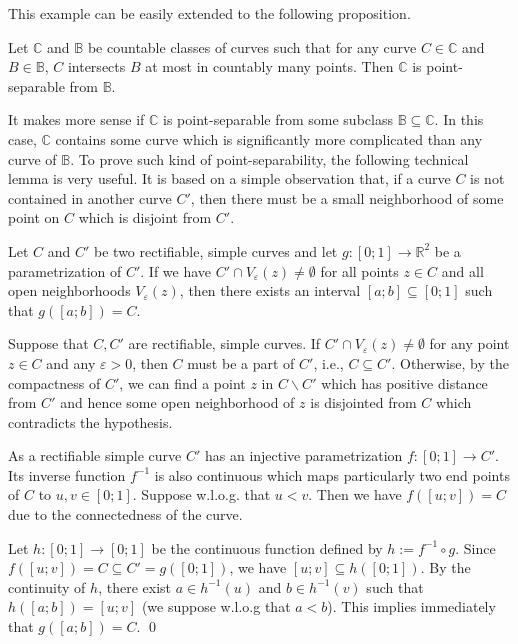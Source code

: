 \documentclass{LMCS}
\theoremstyle{plain}
\def\IB{\mathbb{B}}
\def\IC{\mathbb{C}}
\def\IR{\mathbb{R}}
\begin{document}
This example can be easily extended to the following proposition.

\begin{prop}\label{prop-p-sep-simple-case}
Let $\IC$ and $\IB$ be countable classes of curves such that for any curve $C\in\IC$ and $B \in \IB$, $C$ intersects $B$ at most in countably many points. Then $\IC$ is point-separable from $\IB$.
\end{prop}

It makes more sense if $\IC$ is point-separable from some subclass $\IB \subseteq \IC$. In this case, $\IC$ contains some curve which is significantly more complicated than any curve of $\IB$. To prove such kind of point-separability, the following technical lemma is very useful. It is based on a simple observation that, if a curve $C$ is not contained in another curve $C'$, then there must be a small neighborhood of some point on $C$ which is disjoint from $C'$.

\begin{lem}\label{lem-two-curves}
Let $C$ and $C'$ be two rectifiable, simple curves and let $g:[0;1]\rightarrow\IR^2$ be a parametrization of $C'$. If we have $C'\cap V_\varepsilon (z) \neq \emptyset$ for all points $z\in C$ and all open neighborhoods $V_\varepsilon (z)$, then there exists an interval $[a;b]\subseteq [0;1]$ such that $g([a;b])=C$.
\end{lem}
\proof
Suppose that $C, C'$ are rectifiable, simple curves. If $C'\cap V_\varepsilon(z) \neq \emptyset$ for any point $z\in C$ and any $\varepsilon>0$, then $C$ must be a part of $C'$, i.e., $C \subseteq C'$. Otherwise, by the compactness of $C'$, we can find a point $z$ in $C\backslash C'$ which has positive distance from $C'$ and hence some open neighborhood of $z$ is disjointed from $C$ which contradicts the hypothesis.

As a rectifiable simple curve $C'$ has an injective parametrization $f:[0;1] \to C'$. Its inverse function $f^{-1}$ is also continuous which maps particularly two end points of $C$ to $u, v\in [0;1]$. Suppose w.l.o.g. that $u<v$. Then we have $f([u;v]) =C$ due to the connectedness of the curve.

Let $h:[0;1] \to [0;1]$ be the continuous function defined by $h:= f^{-1} \circ g$. Since $f([u;v]) =C \subseteq C' =g([0;1])$, we have $[u;v] \subseteq h([0;1])$. By the continuity of $h$, there exist  $a \in h^{-1}(u)$ and $b \in h^{-1}(v)$ such that $h([a; b]) =[u; v]$ (we suppose w.l.o.g that $a < b$). This implies immediately that $g([a; b]) =C$.
\qed
\end{document}
